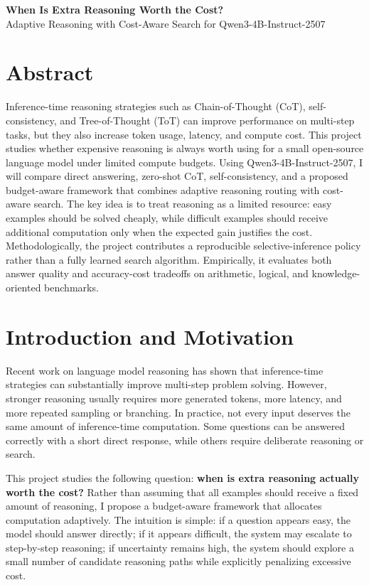 \documentclass[10pt]{article}
\begin{document}
\small

\begin{center}
    {\Large \textbf{When Is Extra Reasoning Worth the Cost?}}\\
    \vspace{0.12em}
    {\normalsize Adaptive Reasoning with Cost-Aware Search for Qwen3-4B-Instruct-2507}
\end{center}

\section*{Abstract}
Inference-time reasoning strategies such as Chain-of-Thought (CoT), self-consistency, and Tree-of-Thought (ToT) can improve performance on multi-step tasks, but they also increase token usage, latency, and compute cost. This project studies whether expensive reasoning is always worth using for a small open-source language model under limited compute budgets. Using Qwen3-4B-Instruct-2507, I will compare direct answering, zero-shot CoT, self-consistency, and a proposed budget-aware framework that combines adaptive reasoning routing with cost-aware search. The key idea is to treat reasoning as a limited resource: easy examples should be solved cheaply, while difficult examples should receive additional computation only when the expected gain justifies the cost. Methodologically, the project contributes a reproducible selective-inference policy rather than a fully learned search algorithm. Empirically, it evaluates both answer quality and accuracy-cost tradeoffs on arithmetic, logical, and knowledge-oriented benchmarks.

\section{Introduction and Motivation}
Recent work on language model reasoning has shown that inference-time strategies can substantially improve multi-step problem solving. However, stronger reasoning usually requires more generated tokens, more latency, and more repeated sampling or branching. In practice, not every input deserves the same amount of inference-time computation. Some questions can be answered correctly with a short direct response, while others require deliberate reasoning or search.

This project studies the following question: \textbf{when is extra reasoning actually worth the cost?} Rather than assuming that all examples should receive a fixed amount of reasoning, I propose a budget-aware framework that allocates computation adaptively. The intuition is simple: if a question appears easy, the model should answer directly; if it appears difficult, the system may escalate to step-by-step reasoning; if uncertainty remains high, the system should explore a small number of candidate reasoning paths while explicitly penalizing excessive cost.
\end{document}
